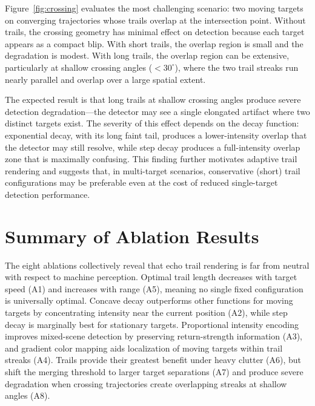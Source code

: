 \documentclass[colorlinks,upint,balance]{asmeconf}
\begin{document}
Figure~\ref{fig:crossing} evaluates the most challenging scenario: two moving targets on converging trajectories whose trails overlap at the intersection point. Without trails, the crossing geometry has minimal effect on detection because each target appears as a compact blip. With short trails, the overlap region is small and the degradation is modest. With long trails, the overlap region can be extensive, particularly at shallow crossing angles ($<30^\circ$), where the two trail streaks run nearly parallel and overlap over a large spatial extent.

The expected result is that long trails at shallow crossing angles produce severe detection degradation---the detector may see a single elongated artifact where two distinct targets exist. The severity of this effect depends on the decay function: exponential decay, with its long faint tail, produces a lower-intensity overlap that the detector may still resolve, while step decay produces a full-intensity overlap zone that is maximally confusing. This finding further motivates adaptive trail rendering and suggests that, in multi-target scenarios, conservative (short) trail configurations may be preferable even at the cost of reduced single-target detection performance.


\section{Summary of Ablation Results}

The eight ablations collectively reveal that echo trail rendering is far from neutral with respect to machine perception. Optimal trail length decreases with target speed (A1) and increases with range (A5), meaning no single fixed configuration is universally optimal. Concave decay outperforms other functions for moving targets by concentrating intensity near the current position (A2), while step decay is marginally best for stationary targets. Proportional intensity encoding improves mixed-scene detection by preserving return-strength information (A3), and gradient color mapping aids localization of moving targets within trail streaks (A4). Trails provide their greatest benefit under heavy clutter (A6), but shift the merging threshold to larger target separations (A7) and produce severe degradation when crossing trajectories create overlapping streaks at shallow angles (A8).
\end{document}

